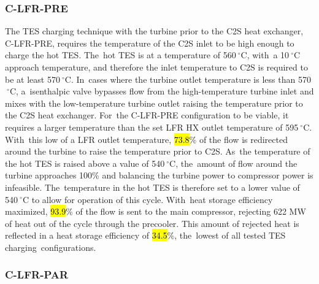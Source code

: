 \documentclass[sustainability,article,accept,moreauthors,pdftex]{Definitions/mdpi}
\begin{document}
\begin{paracol}{2}
\subsubsection{C-LFR-PRE}
The TES charging technique with the turbine prior to the C2S heat exchanger, C-LFR-PRE, requires the temperature of the C2S inlet to be high enough to charge the hot TES. The~hot TES is at a temperature of 560$~^{\circ}$C, with~a 10$~^{\circ}$C approach temperature, and therefore the inlet temperature to C2S is required to be at least 570$~^{\circ}$C. In~cases where the turbine outlet temperature is less than 570$~^{\circ}$C, a~isenthalpic valve bypasses flow from the high-temperature turbine inlet and mixes with the low-temperature turbine outlet raising the temperature prior to the C2S heat exchanger. For~the C-LFR-PRE configuration to be viable, it requires a larger temperature than the set LFR HX outlet temperature of 595$~^{\circ}$C. With~this low of a LFR outlet temperature, \hl{73.8}\% of the flow is redirected around the turbine to raise the temperature prior to C2S. As~the temperature of the hot TES is raised above a value of 540$~^{\circ}$C, the~amount of flow around the turbine approaches 100\% and balancing the turbine power to compressor power is infeasible. The~temperature in the hot TES is therefore set to a lower value of 540$~^{\circ}$C to allow for operation of this cycle. With~heat storage efficiency maximized, \hl{93.9}\% of the flow is sent to the main compressor, rejecting 622 MW of heat out of the cycle through the precooler. This amount of rejected heat is reflected in a heat storage efficiency of \hl{34.5}\%, the~lowest of all tested TES charging~configurations.

\subsubsection{C-LFR-PAR}


\end{paracol}
\end{document}
